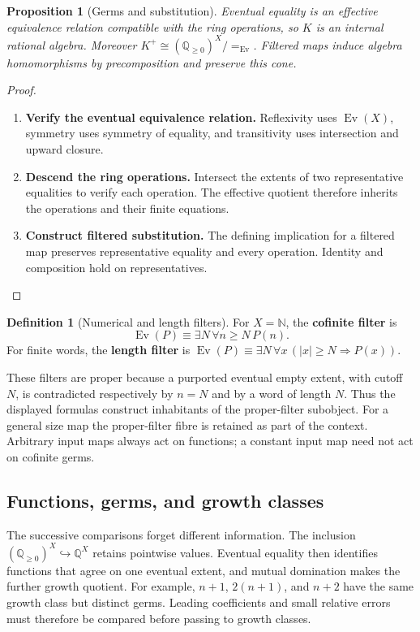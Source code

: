 \documentclass[11pt,a4paper]{article}
\numberwithin{algorithm}{section}
\numberwithin{equation}{section}
\newtheorem{proposition}[proposition]{Proposition}
\theoremstyle{definition}
\newtheorem{definition}[definition]{Definition}
\theoremstyle{remark}
\theoremstyle{plain}
\newcommand{\N}{\mathbb N}
\newcommand{\QQ}{\mathbb Q}
\newcommand{\incl}{\hookrightarrow}
\newcommand{\Qplus}{{\QQ_{\ge0}}}
\newcommand{\Ev}{{\operatorname{Ev}}}
\theoremstyle{definition}
\theoremstyle{plain}
\begin{document}
\begin{proposition}[Germs and substitution]\label{prop:germs}
Eventual equality is an effective equivalence relation compatible
with the ring operations, so $K$ is an internal rational algebra.
Moreover $K^+\cong(\Qplus)^X/{=_{\Ev}}$. Filtered maps induce
algebra homomorphisms by precomposition and preserve this cone.
\end{proposition}
\begin{proof}\leavevmode
\begin{enumerate}[leftmargin=*,align=left]
\item \textbf{Verify the eventual equivalence relation.}
Reflexivity uses $\Ev(X)$, symmetry uses symmetry of equality,
and transitivity uses intersection and upward closure.

\item \textbf{Descend the ring operations.}
Intersect the extents of two representative equalities to
verify each operation. The effective quotient therefore inherits
the operations and their finite equations.

\item \textbf{Construct filtered substitution.}
The defining implication
for a filtered map preserves representative equality and every
operation. Identity and composition hold on representatives.
\end{enumerate}
\end{proof}


\begin{definition}[Numerical and length filters]\label{def:cofinite-length-filters}
For $X=\N$, the \textbf{cofinite filter} is
\[
 \Ev(P)\equiv\exists N\,\forall n\ge N\,P(n).
\]
For finite words, the \textbf{length filter} is
$\Ev(P)\equiv\exists N\,\forall x\,(\lvert x\rvert\ge N\Rightarrow P(x))$.
\end{definition}


These filters are proper because a purported eventual empty extent,
with cutoff $N$, is contradicted respectively by $n=N$ and by a word
of length $N$. Thus the displayed formulas construct inhabitants
of the proper-filter subobject. For a general size map the proper-filter
fibre is retained as part of the context. Arbitrary input maps always
act on functions; a constant input map need not act on cofinite germs.

\subsection{Functions, germs, and growth classes}
\label{sec:exact-profiles}
The successive comparisons forget different information.
The inclusion $(\Qplus)^X\incl\QQ^X$ retains pointwise values.
Eventual equality then identifies functions that agree on one eventual
extent, and mutual domination makes the further growth quotient.
For example, $n+1$, $2(n+1)$, and $n+2$ have the same growth class
but distinct germs. Leading coefficients and small relative
errors must therefore be compared before passing to growth classes.
\end{document}
